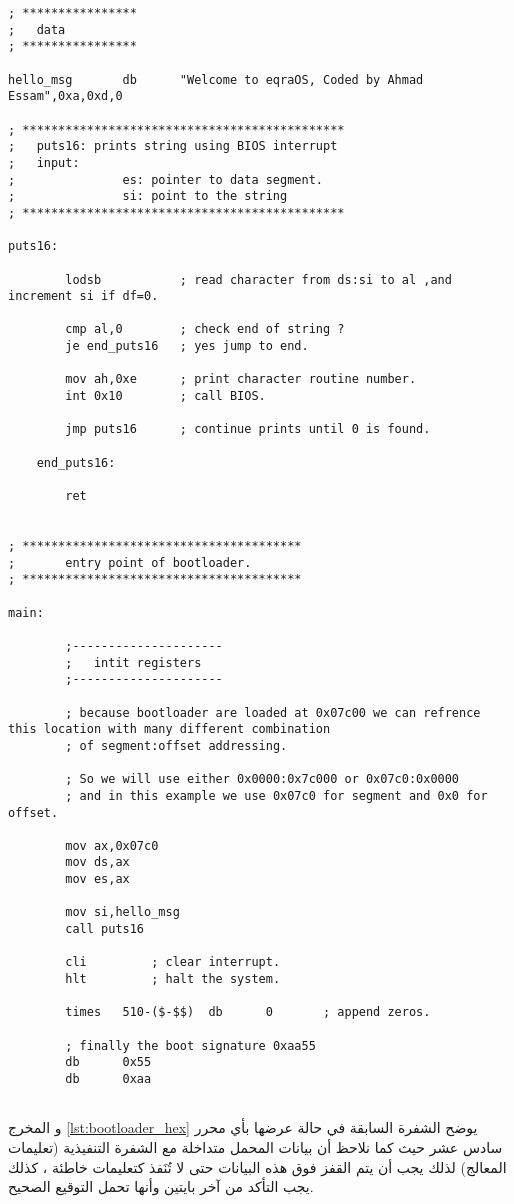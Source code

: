 \documentclass[document.tex]{subfiles}
\begin{document}
\begin{english}
\begin{lstlisting}[label=lst:bpb_bootloader,caption=\en{BPB example}]
; ****************
;	data
; ****************

hello_msg		db		"Welcome to eqraOS, Coded by Ahmad Essam",0xa,0xd,0

; *********************************************
;	puts16: prints string using BIOS interrupt
;   input:
;				es: pointer to data segment.
;				si: point to the string
; *********************************************

puts16:
		
		lodsb			; read character from ds:si to al ,and increment si if df=0.
		
		cmp al,0		; check end of string ?
		je end_puts16	; yes jump to end.
		
		mov ah,0xe		; print character routine number.
		int 0x10		; call BIOS.
		
		jmp puts16		; continue prints until 0 is found.
		
	end_puts16:
	
		ret				
		
		
; ***************************************
;		entry point of bootloader.
; ***************************************
		
main:				

		;---------------------
		;	intit registers
		;---------------------
		
		; because bootloader are loaded at 0x07c00 we can refrence this location with many different combination
		; of segment:offset addressing.
		
		; So we will use either 0x0000:0x7c000 or 0x07c0:0x0000
		; and in this example we use 0x07c0 for segment and 0x0 for offset.
		
		mov ax,0x07c0			
		mov ds,ax
		mov es,ax
		
		mov si,hello_msg
		call puts16

		cli			; clear interrupt.		
		hlt			; halt the system.
		
		times	510-($-$$)	db		0		; append zeros.
		
		; finally the boot signature 0xaa55
		db		0x55
		db		0xaa
		

\end{lstlisting}
\end{english}


و المخرج \ref{lst:bootloader_hex} يوضح الشفرة السابقة في حالة عرضها بأي محرر سادس عشر  حيث كما نلاحظ أن بيانات المحمل متداخلة مع الشفرة التنفيذية (تعليمات المعالج) لذلك يجب أن يتم القفز فوق هذه البيانات حتى لا تُنَفذ كتعليمات خاطئة ، كذلك يجب التأكد من آخر بايتين وأنها تحمل التوقيع الصحيح.
\end{document}
